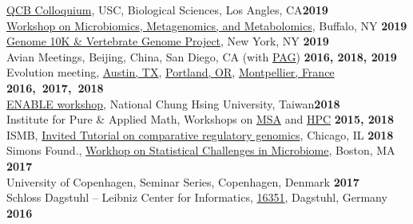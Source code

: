 \documentclass[margin,line,letterpaper]{resume}
\begin{document}
\begin{resume}
      \href{https://uscbiscgrad.blogspot.com/2019/10/dr.html}{QCB Colloquium}, USC, Biological Sciences, Los Angles, CA\hfill \textbf{2019}\\
        \href{https://sites.google.com/view/mmm2019/home}{Workshop on Microbiomics, Metagenomics, and Metabolomics}, Buffalo, NY  \hfill \textbf{2019}\\
         \href{https://www.eventbrite.com/e/the-g10k-vgpebp-meeting-tickets-59112745814?aff=ebdshpsearchautocomplete}{Genome 10K \& Vertebrate Genome Project}, New York, NY \hfill \textbf{2019}\\
        Avian Meetings, Beijing, China,  San Diego, CA (with \href{https://pag.confex.com/pag/xxvii/meetingapp.cgi/Paper/36191}{PAG}) \hfill \textbf{2016, 2018, 2019}\\
        Evolution meeting,  \href{https://www.evolutionmeetings.org/uploads/4/8/8/0/48804503/evolution_2016_final_pdf_program.pdf}{Austin, TX},  \href{http://www.evolutionmeetings.org/uploads/4/8/8/0/48804503/final_evol2017_program.pdf}{Portland, OR}, \href{http://tandy.cs.illinois.edu/PhyloSynth-Symp2018.html}{Montpellier, France} \hfill \textbf{2016,~2017,~2018}\\
 \href{http://enable.nchu.edu.tw/international-page.php?uuid=f46f7f64-399e-11e9-97aa-309c231618d5}{ENABLE workshop},         National Chung Hsing University, Taiwan\hfill \textbf{2018}\\
        Institute for Pure \& Applied Math, Workshops on \href{http://www.ipam.ucla.edu/programs/workshops/multiple-sequence-alignment/?tab=speaker-list}{MSA} and \href{http://www.ipam.ucla.edu/programs/workshops/workshop-iii-hpc-for-computationally-and-data-intensive-problems/?tab=speaker-list}{HPC} \hfill \textbf{2015, 2018}\\
        ISMB, \href{https://www.iscb.org/ismb2018-program/ismb2018-tutorials#am4}{Invited Tutorial on comparative regulatory genomics}, Chicago, IL 
        \hfill \textbf{2018}\\
        Simons Found., \href{https://indico.flatironinstitute.org/category/17/attachments/30/35/General_Agenda_SACMDA2_.pdf}{Workhop on Statistical Challenges in Microbiome}, Boston, MA %
         \hfill \textbf{2017}\\
         University of Copenhagen, Seminar Series, Copenhagen, Denmark  \hfill \textbf{2017}\\
         Schloss Dagstuhl -- Leibniz Center for Informatics, \href{https://www.dagstuhl.de/no_cache/en/program/calendar/partlist/?semnr=16351&SUOG=}{16351}, Dagstuhl, Germany  \hfill \textbf{2016}\\

\end{resume}
\end{document}
